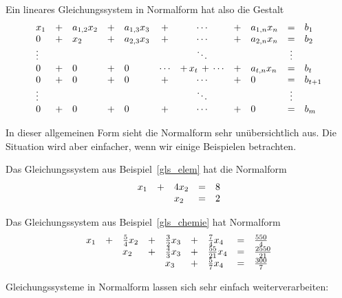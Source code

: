 \begin{notiz} Ein lineares Gleichungssystem in Normalform hat also die Gestalt
  	\begin{equation}\label{equ_lgs_normal} 
  	\begin{array} {l c l c l c c c l c l }
  	x_1 & + & a_{1,2} x_2 & + & a_{1,3} x_3 & + & \cdots & + & a_{1,n} x_n & = & b_1 \\
  	0 & + &  x_2 &  + & a_{2,3} x_3 & + & \cdots & + & a_{2,n} x_n & = & b_2 \\
 	\vdots & & &  & & & \ddots & & & \vdots \\
  	0 & + & 0 & + & 0 &  \cdots &  + \, x_t \, +  \, \cdots & + & a_{t,n} x_n & = & b_t \\  
  	0 & + & 0 & + & 0 & + & \cdots & + & 0 & = & b_{t+1} \\
  	\vdots & &  & & & & \ddots  & & & \vdots \\
  	0 & + & 0 & + & 0 & + & \cdots & + & 0 & = & b_m 
  	\end{array} 
  	\end{equation} 
\end{notiz}

In dieser allgemeinen Form sieht die Normalform sehr unübersichtlich aus. Die Situation wird aber einfacher, 
wenn wir einige Beispielen betrachten.

\begin{beispiel} Das Gleichungssystem aus Beispiel~\ref{gls_elem} hat die Normalform
  	$$ \begin{array} {l c l c l}
     	x_1 & + & 4 x_2 & = & 8 \\
     	&   & x_2 & = & 2 
   	\end{array} $$
\end{beispiel}

\begin{beispiel} Das Gleichungssystem aus Beispiel~\ref{gls_chemie} hat Normalform
  	$$ \begin{array} {l c l c l c l c l}
   	x_1 & + & \frac {5}{4} x_2 & + & \frac {3}{2} x_3 & + & \frac {7}{4} x_4 & = & \frac {550}{4} \\
   	&   & x_2 & + & \frac {4}{3} x_3 & + & \frac {55}{21} x_4 & = & \frac {2550}{21} \\
  	&   &  &  & x_3 & + & \frac {5}{7} x_4 & = & \frac {300}{7} 
  	\end{array} $$
\end{beispiel}

Gleichungssysteme in Normalform lassen sich sehr einfach weiterverarbeiten:

